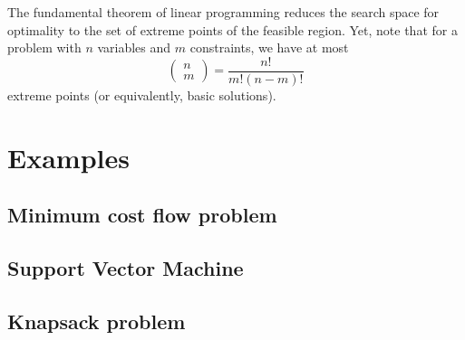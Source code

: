 \begin{observation}
    The fundamental theorem of linear programming reduces the search space for optimality to the set of extreme points of the feasible region. Yet, note that for a problem with $n$ variables and $m$ constraints, we have at most \[ \begin{pmatrix} n\\ m \end{pmatrix} = \frac{n!}{m!(n-m)!} \] extreme points (or equivalently, basic solutions). 
\end{observation}

\section{Examples}
\label{sec:lpb_examples}
\subsection{Minimum cost flow problem}
\subsection{Support Vector Machine}
\subsection{Knapsack problem}
